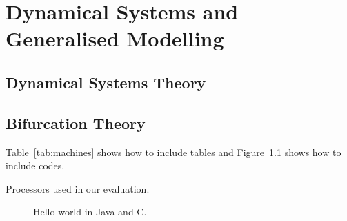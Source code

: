 \chapter{Dynamical Systems and Generalised Modelling}
\label{cha:methodology}

\section{Dynamical Systems Theory}
\label{sec:softplat}



\section{Bifurcation Theory}
\label{sec:hardplat}

Table~\ref{tab:machines} shows how to include tables and Figure~\ref{fig:helloworld} shows how to include codes.
\begin{table*}
  \centering
  
  \caption{Processors used in our evaluation.}
  \label{tab:machines}
\end{table*}



\begin{figure}
  \centering
  \subfigure[\label{fig:c:hello}]{
  \begin{minipage}[b]{\columnwidth}
    \vspace*{-2ex}
  \end{minipage}}
  \subfigure[\label{fig:java:hello}]{
  \begin{minipage}[b]{\columnwidth}
    \vspace*{-2ex}
  \end{minipage}}
  \caption{Hello world in Java and C.}
  \label{fig:helloworld}
\end{figure}



